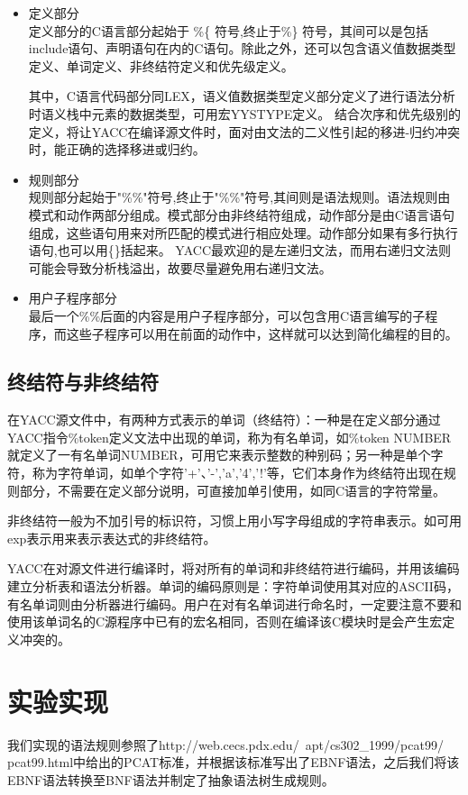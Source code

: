 \documentclass{article}
\begin{document}
\begin{itemize}
\item 定义部分 \\
定义部分的C语言部分起始于 \%\{ 符号,终止于\%\} 符号，其间可以是包括include语句、声明语句在内的C语句。除此之外，还可以包含语义值数据类型定义、单词定义、非终结符定义和优先级定义。

其中，C语言代码部分同LEX，语义值数据类型定义部分定义了进行语法分析时语义栈中元素的数据类型，可用宏YYSTYPE定义。
结合次序和优先级别的定义，将让YACC在编译源文件时，面对由文法的二义性引起的移进-归约冲突时，能正确的选择移进或归约。
\item 规则部分 \\
规则部分起始于"\%\%"符号,终止于"\%\%"符号,其间则是语法规则。语法规则由模式和动作两部分组成。模式部分由非终结符组成，动作部分是由C语言语句组成，这些语句用来对所匹配的模式进行相应处理。动作部分如果有多行执行语句,也可以用\{\}括起来。 YACC最欢迎的是左递归文法，而用右递归文法则可能会导致分析栈溢出，故要尽量避免用右递归文法。
\item 用户子程序部分 \\
最后一个\%\%后面的内容是用户子程序部分，可以包含用C语言编写的子程序，而这些子程序可以用在前面的动作中，这样就可以达到简化编程的目的。

\end{itemize}

\subsection{终结符与非终结符}
在YACC源文件中，有两种方式表示的单词（终结符）：一种是在定义部分通过YACC指令\%token定义文法中出现的单词，称为有名单词，如\%token NUMBER就定义了一有名单词NUMBER，可用它来表示整数的种别码；另一种是单个字符，称为字符单词，如单个字符’+’、’-’,’a’,’4’,’!’等，它们本身作为终结符出现在规则部分，不需要在定义部分说明，可直接加单引使用，如同C语言的字符常量。

非终结符一般为不加引号的标识符，习惯上用小写字母组成的字符串表示。如可用exp表示用来表示表达式的非终结符。

YACC在对源文件进行编译时，将对所有的单词和非终结符进行编码，并用该编码建立分析表和语法分析器。单词的编码原则是：字符单词使用其对应的ASCII码，有名单词则由分析器进行编码。用户在对有名单词进行命名时，一定要注意不要和使用该单词名的C源程序中已有的宏名相同，否则在编译该C模块时是会产生宏定义冲突的。

\section{实验实现}
我们实现的语法规则参照了http://web.cecs.pdx.edu/~apt/cs302\_1999/pcat99/\\pcat99.html中给出的PCAT标准，并根据该标准写出了EBNF语法，之后我们将该EBNF语法转换至BNF语法并制定了抽象语法树生成规则。
\end{document}

